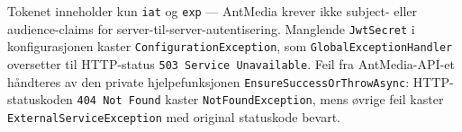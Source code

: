 Tokenet inneholder kun \texttt{iat} og \texttt{exp} — AntMedia krever
ikke subject- eller audience-claims for server-til-server-autentisering.
Manglende \texttt{JwtSecret} i konfigurasjonen kaster
\texttt{ConfigurationException}, som \texttt{GlobalExceptionHandler}
oversetter til HTTP-status \texttt{503 Service Unavailable}. Feil fra AntMedia-API-et håndteres av den private hjelpefunksjonen \texttt{EnsureSuccessOrThrowAsync}: HTTP-statuskoden \texttt{404 Not Found} kaster \texttt{NotFoundException}, mens øvrige feil kaster \texttt{ExternalServiceException} med original statuskode bevart.